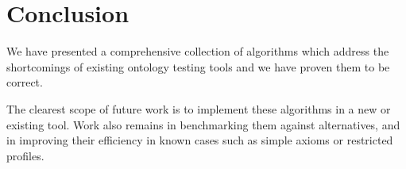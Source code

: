 \documentclass[paper.tex]{subfiles}
\begin{document}
\section{Conclusion}
\label{sec:conclusion}

We have presented a comprehensive collection of algorithms which address the shortcomings of existing ontology testing tools and we have proven them to be correct.

The clearest scope of future work is to implement these algorithms in a new or existing tool.
Work also remains in benchmarking them against alternatives, and in improving their efficiency in known cases such as simple axioms or restricted profiles.
\end{document}
